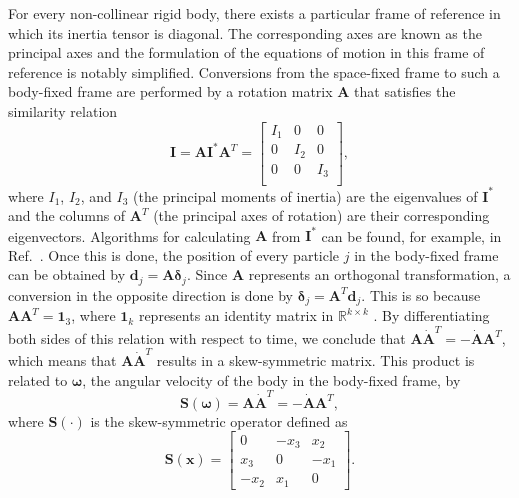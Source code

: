 \documentclass[aip,jcp,reprint,amsmath,amssymb]{revtex4-1}
\newcommand{\mt}[1]{\boldsymbol{\mathbf{#1}}}           %
\newcommand{\vt}[1]{\boldsymbol{\mathbf{#1}}}           %
\newcommand{\tr}[1]{#1^T}                               %
\begin{document}
For every non-collinear rigid body, there exists a particular frame of reference in which its inertia tensor is diagonal. The corresponding axes are known as the principal axes and the formulation of the equations of motion in this frame of reference is notably simplified. Conversions from the space-fixed frame to such a body-fixed frame are performed by a rotation matrix $\mt A$ that satisfies the similarity relation\citep{Goldstein2002}
\[
{\mt I} = {\mt A} {\mt I}^\ast \tr{\mt A} = \left[ \begin{array}{ccc}
I_1 &   0 &   0 \\
  0 & I_2 &   0 \\
  0 &   0 & I_3 \\
\end{array} \right],
\]
where $I_1$, $I_2$, and $I_3$ (the principal moments of inertia) are the eigenvalues of ${\mt I}^\ast$ and the columns of $\tr{\mt A}$ (the principal axes of rotation) are their corresponding eigenvectors. Algorithms for calculating $\mt A$ from $\mt I^\ast$ can be found, for example, in Ref.~. Once this is done, the position of every particle $j$ in the body-fixed frame can be obtained by ${\vt d}_j = {\mt A} {\vt \delta}_j$. Since $\mt A$ represents an orthogonal transformation, a conversion in the opposite direction is done by ${\vt \delta}_j = \tr{\mt A} {\vt d}_j$.\cite{Goldstein2002} This is so because $\mt A \tr{\mt A} = \mt 1_3$, where $\mt 1_k$ represents an identity matrix in $\mathbb{R}^{k \times k}$ . By differentiating both sides of this relation with respect to time, we conclude that $\mt A \tr{\dot {\mt A}} = - \dot{\mt A} \tr{\mt A}$, which means that $\mt A \tr{\dot{\mt A}}$ results in a skew-symmetric matrix. This product is related to $\vt \omega$, the angular velocity of the body in the body-fixed frame, by\cite{Haug1989}
\begin{equation}
\label{eq:relation_A_omega}
\mt S(\vt \omega) = \mt A \tr{\dot{\mt A}} = -\dot{\mt A} \tr{\mt A},
\end{equation}
where $\mt S(\cdot)$ is the skew-symmetric operator defined as
\begin{equation}
\label{eq:operator_S}
\mt S(\vt x) = \left[ \begin{array}{ccc}
 0   & -x_3 &  x_2 \\
 x_3 &  0   & -x_1 \\
-x_2 &  x_1 &  0
\end{array}\right].
\end{equation}
\end{document}
